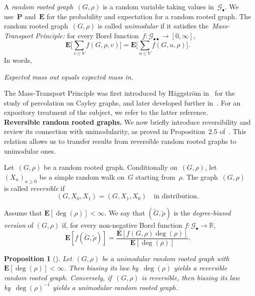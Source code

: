 \documentclass[a4paper,11pt]{article}
\newtheorem{proposition}{Proposition}
\theoremstyle{definition}
\begin{document}
A \emph{random rooted graph}~$(G,\rho)$ is a random variable taking values in~$\mathcal G_\bullet$. We use~$\mathbf P$ and~$\mathbf E$ for the probability and expectation for a random rooted graph. The random rooted graph~$(G,\rho)$ is called \emph{unimodular} if it satisfies the~\emph{Mass-Transport Principle:} for every Borel function~$f:\mathcal G_{\bullet \bullet} \to [0,\infty]$,
\begin{equation}\label{Mass_Transport_Principle}
    \mathbf E \Big[\sum_{v \in V} f(G,\rho,v) \Big] = \mathbf E \Big[\sum_{u \in V} f(G,u,\rho) \Big].
\end{equation}
In words,
\begin{center}
    \emph{Expected mass out equals expected mass in.}
\end{center}
The Mass-Transport Principle was first introduced by Häggström in~\cite{Haggstrom1997} for the study of percolation on Cayley graphs, and later developed further in~\cite{AldousLyons2007}. For an expository treatment of the subject, we refer to the latter reference. \\

\noindent \textbf{Reversible random rooted graphs.} We now briefly introduce reversibility and review its connection with unimodularity, as proved in Proposition~2.5 of~\cite{BenjaminiCurien2012}. This relation allows us to transfer results from reversible random rooted graphs to unimodular ones.

Let~$(G,\rho)$ be a random rooted graph. Conditionally on~$(G,\rho)$, let~$(X_n)_{n \ge 0}$ be a simple random walk on~$G$ starting from~$\rho$. The graph~$(G,\rho)$ is called \emph{reversible} if
$$ (G,X_0,X_1) = (G,X_1,X_0) \quad \text{in distribution.} $$

Assume that $\mathbf E[\deg(\rho)]<\infty$. We say that $(\widetilde G,\widetilde \rho)$ is the \emph{degree-biased version} of $(G,\rho)$ if, for every non-negative Borel function $f:\mathcal G_\bullet\to\mathbb R$,
\[
\mathbf E[f(\widetilde G,\widetilde \rho)]
=
\frac{\mathbf E[f(G,\rho)\deg(\rho)]}{\mathbf E[\deg(\rho)]}.
\]

\begin{proposition}[\cite{BenjaminiCurien2012}]\label{prop_rev_unimod}
Let~$(G,\rho)$ be a unimodular random rooted graph with~$\mathbf E[\deg(\rho)]<\infty$. Then biasing its law by~$\deg(\rho)$ yields a reversible random rooted graph. Conversely, if~$(G,\rho)$ is reversible, then biasing its law by~$\deg(\rho)^{-1}$ yields a unimodular random rooted graph.
\end{proposition}
\end{document}
